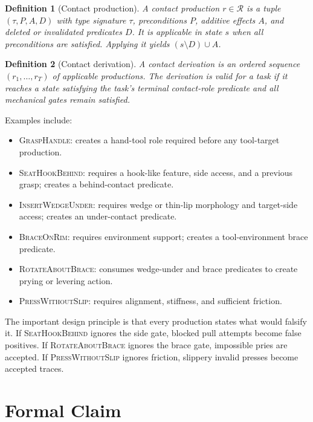 \documentclass{article}
\newtheorem{definition}{Definition}
\newcommand{\Rules}{\mathcal{R}}
\begin{document}
\begin{definition}[Contact production]
A contact production $r\in\Rules$ is a tuple $(\tau,P,A,D)$ with type signature $\tau$, preconditions $P$, additive effects $A$, and deleted or invalidated predicates $D$. It is applicable in state $s$ when all preconditions are satisfied. Applying it yields $(s\setminus D)\cup A$.
\end{definition}

\begin{definition}[Contact derivation]
A contact derivation is an ordered sequence $(r_1,\ldots,r_T)$ of applicable productions. The derivation is valid for a task if it reaches a state satisfying the task's terminal contact-role predicate and all mechanical gates remain satisfied.
\end{definition}

Examples include:
\begin{itemize}
    \item \textsc{GraspHandle}: creates a hand-tool role required before any tool-target production.
    \item \textsc{SeatHookBehind}: requires a hook-like feature, side access, and a previous grasp; creates a behind-contact predicate.
    \item \textsc{InsertWedgeUnder}: requires wedge or thin-lip morphology and target-side access; creates an under-contact predicate.
    \item \textsc{BraceOnRim}: requires environment support; creates a tool-environment brace predicate.
    \item \textsc{RotateAboutBrace}: consumes wedge-under and brace predicates to create prying or levering action.
    \item \textsc{PressWithoutSlip}: requires alignment, stiffness, and sufficient friction.
\end{itemize}

The important design principle is that every production states what would falsify it. If \textsc{SeatHookBehind} ignores the side gate, blocked pull attempts become false positives. If \textsc{RotateAboutBrace} ignores the brace gate, impossible pries are accepted. If \textsc{PressWithoutSlip} ignores friction, slippery invalid presses become accepted traces.

\section{Formal Claim}
\end{document}
